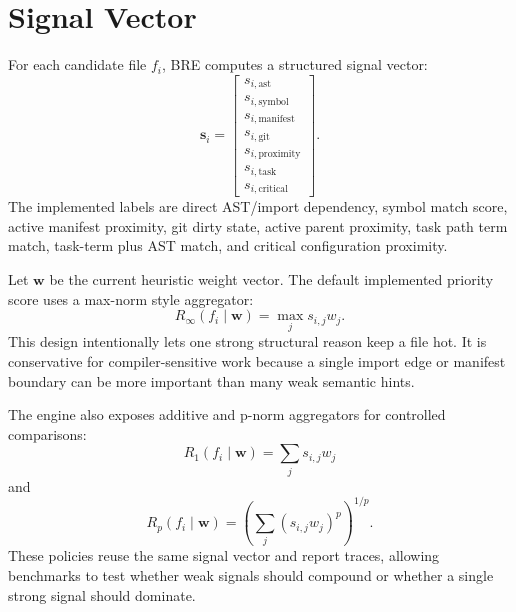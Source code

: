 \documentclass[11pt,onecolumn]{article}
\begin{document}
\section{Signal Vector}
For each candidate file $f_i$, BRE computes a structured signal vector:
\begin{equation}
\mathbf{s}_i =
\begin{bmatrix}
s_{i,\mathrm{ast}} \\
s_{i,\mathrm{symbol}} \\
s_{i,\mathrm{manifest}} \\
s_{i,\mathrm{git}} \\
s_{i,\mathrm{proximity}} \\
s_{i,\mathrm{task}} \\
s_{i,\mathrm{critical}}
\end{bmatrix}.
\end{equation}
The implemented labels are direct AST/import dependency, symbol match score, active manifest proximity, git dirty state, active parent proximity, task path term match, task-term plus AST match, and critical configuration proximity.

Let $\mathbf{w}$ be the current heuristic weight vector. The default implemented priority score uses a max-norm style aggregator:
\begin{equation}
R_\infty(f_i \mid \mathbf{w}) =
\max_j s_{i,j} w_j.
\end{equation}
This design intentionally lets one strong structural reason keep a file hot. It is conservative for compiler-sensitive work because a single import edge or manifest boundary can be more important than many weak semantic hints.

The engine also exposes additive and p-norm aggregators for controlled comparisons:
\begin{equation}
R_1(f_i \mid \mathbf{w}) = \sum_j s_{i,j}w_j
\end{equation}
and
\begin{equation}
R_p(f_i \mid \mathbf{w}) = \left(\sum_j (s_{i,j}w_j)^p\right)^{1/p}.
\end{equation}
These policies reuse the same signal vector and report traces, allowing benchmarks to test whether weak signals should compound or whether a single strong signal should dominate.
\end{document}

